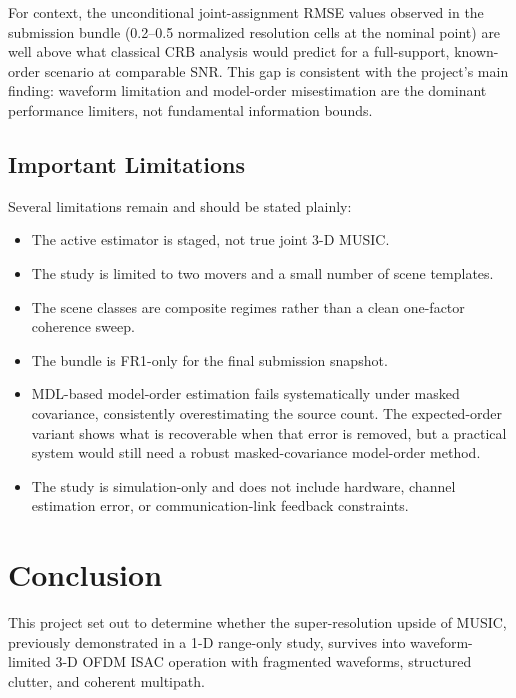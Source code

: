 \documentclass[11pt]{article}
\begin{document}
For context, the unconditional joint-assignment RMSE values observed in the submission bundle (0.2--0.5 normalized resolution cells at the nominal point) are well above what classical CRB analysis would predict for a full-support, known-order scenario at comparable SNR. This gap is consistent with the project's main finding: waveform limitation and model-order misestimation are the dominant performance limiters, not fundamental information bounds.

\subsection{Important Limitations}

Several limitations remain and should be stated plainly:
\begin{itemize}
  \item The active estimator is staged, not true joint 3-D MUSIC.
  \item The study is limited to two movers and a small number of scene templates.
  \item The scene classes are composite regimes rather than a clean one-factor coherence sweep.
  \item The bundle is FR1-only for the final submission snapshot.
  \item MDL-based model-order estimation fails systematically under masked covariance, consistently overestimating the source count. The expected-order variant shows what is recoverable when that error is removed, but a practical system would still need a robust masked-covariance model-order method.
  \item The study is simulation-only and does not include hardware, channel estimation error, or communication-link feedback constraints.
\end{itemize}

\section{Conclusion}

This project set out to determine whether the super-resolution upside of MUSIC, previously demonstrated in a 1-D range-only study, survives into waveform-limited 3-D OFDM ISAC operation with fragmented waveforms, structured clutter, and coherent multipath.
\end{document}
